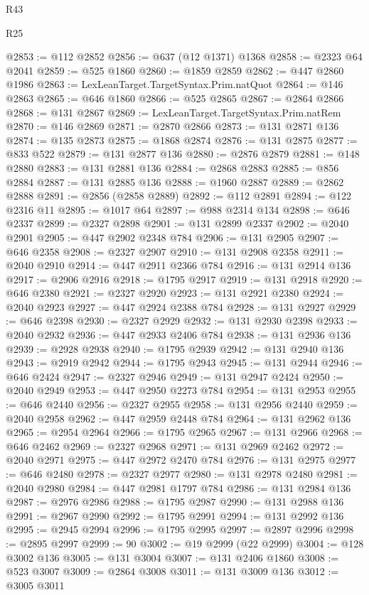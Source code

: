 \begin{lexlean}{R43}
\begin{lexlean}{R25}
\begin{coremodule}
{{{{{{{{{{{{{{{{{{{{{{{{{{{{{{{{{{{{{{{{{{{{{{{{{{{{{{{{{{{{{{{{{{{{{{{{{{{{{{{{{{{{{{{{{{{{{{{{{{{{{{{{{{{{{{{{{{{{{{{{{{{{{{{{{{{{{{{{{{{{{{{{{{{{{{{{{{{{{{{{{{{{{{{{{{{{{{{{{{{{{{{{{{{{{{{{{@2853 := @112 @2852
@2856 := @637 (@12 @1371) @1368
@2858 := @2323 @64 @2041
@2859 := @525 @1860
@2860 := @1859 @2859
@2862 := @447 @2860 @1986
@2863 := LexLeanTarget.TargetSyntax.Prim.natQuot
@2864 := @146 @2863
@2865 := @646 @1860
@2866 := @525 @2865
@2867 := @2864 @2866
@2868 := @131 @2867
@2869 := LexLeanTarget.TargetSyntax.Prim.natRem
@2870 := @146 @2869
@2871 := @2870 @2866
@2873 := @131 @2871 @136
@2874 := @135 @2873
@2875 := @1868 @2874
@2876 := @131 @2875
@2877 := @833 @522
@2879 := @131 @2877 @136
@2880 := @2876 @2879
@2881 := @148 @2880
@2883 := @131 @2881 @136
@2884 := @2868 @2883
@2885 := @856 @2884
@2887 := @131 @2885 @136
@2888 := @1960 @2887
@2889 := @2862 @2888
@2891 := @2856 (@2858 @2889)
@2892 := @112 @2891
@2894 := @122 @2316 @11
@2895 := @1017 @64
@2897 := @988 @2314 @134
@2898 := @646 @2337
@2899 := @2327 @2898
@2901 := @131 @2899 @2337
@2902 := @2040 @2901
@2905 := @447 @2902 @2348 @784
@2906 := @131 @2905
@2907 := @646 @2358
@2908 := @2327 @2907
@2910 := @131 @2908 @2358
@2911 := @2040 @2910
@2914 := @447 @2911 @2366 @784
@2916 := @131 @2914 @136
@2917 := @2906 @2916
@2918 := @1795 @2917
@2919 := @131 @2918
@2920 := @646 @2380
@2921 := @2327 @2920
@2923 := @131 @2921 @2380
@2924 := @2040 @2923
@2927 := @447 @2924 @2388 @784
@2928 := @131 @2927
@2929 := @646 @2398
@2930 := @2327 @2929
@2932 := @131 @2930 @2398
@2933 := @2040 @2932
@2936 := @447 @2933 @2406 @784
@2938 := @131 @2936 @136
@2939 := @2928 @2938
@2940 := @1795 @2939
@2942 := @131 @2940 @136
@2943 := @2919 @2942
@2944 := @1795 @2943
@2945 := @131 @2944
@2946 := @646 @2424
@2947 := @2327 @2946
@2949 := @131 @2947 @2424
@2950 := @2040 @2949
@2953 := @447 @2950 @2273 @784
@2954 := @131 @2953
@2955 := @646 @2440
@2956 := @2327 @2955
@2958 := @131 @2956 @2440
@2959 := @2040 @2958
@2962 := @447 @2959 @2448 @784
@2964 := @131 @2962 @136
@2965 := @2954 @2964
@2966 := @1795 @2965
@2967 := @131 @2966
@2968 := @646 @2462
@2969 := @2327 @2968
@2971 := @131 @2969 @2462
@2972 := @2040 @2971
@2975 := @447 @2972 @2470 @784
@2976 := @131 @2975
@2977 := @646 @2480
@2978 := @2327 @2977
@2980 := @131 @2978 @2480
@2981 := @2040 @2980
@2984 := @447 @2981 @1797 @784
@2986 := @131 @2984 @136
@2987 := @2976 @2986
@2988 := @1795 @2987
@2990 := @131 @2988 @136
@2991 := @2967 @2990
@2992 := @1795 @2991
@2994 := @131 @2992 @136
@2995 := @2945 @2994
@2996 := @1795 @2995
@2997 := @2897 @2996
@2998 := @2895 @2997
@2999 := 90
@3002 := @19 @2999 (@22 @2999)
@3004 := @128 @3002 @136
@3005 := @131 @3004
@3007 := @131 @2406 @1860
@3008 := @523 @3007
@3009 := @2864 @3008
@3011 := @131 @3009 @136
@3012 := @3005 @3011
}}}}}}}}}}}}}}}}}}}}}}}}}}}}}}}}}}}}}}}}}}}}}}}}}}}}}}}}}}}}}}}}}}}}}}}}}}}}}}}}}}}}}}}}}}}}}}}}}}}}}}}}}}}}}}}}}}}}}}}}}}}}}}}}}}}}}}}}}}}}}}}}}}}}}}}}}}}}}}}}}}}}}}}}}}}}}}}}}}}}}}}}}}}}}}}}}
\end{coremodule}
\end{lexlean}
\end{lexlean}

